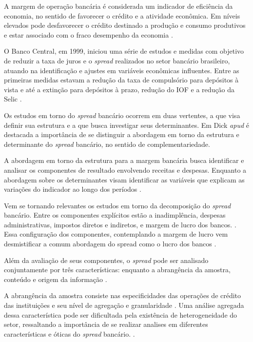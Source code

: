 \documentclass[12pt,openright,oneside,a4paper,chapter=TITLE,section=TITLE,subsection=Title,english,french,spanish,portugues,sumario=tradicional]{04-class-files/abntex2}
\begin{document}
A margem de operação bancária é considerada um indicador de eficiência da economia, no sentido de favorecer o crédito e a atividade econômica. Em níveis elevados pode desfavorecer o crédito destinado a produção e consumo produtivos e estar associado com o fraco desempenho da economia \cite{WB:2005}.

O Banco Central, em 1999, iniciou uma série de estudos e medidas com objetivo de reduzir a taxa de juros e o \emph{spread} realizados no setor bancário brasileiro, atuando na identificação e ajustes em variáveis econômicas influentes. Entre as primeiras medidas estavam a redução da taxa de compulsório para depósitos à vista e até a extinção para depósitos à prazo, redução do IOF e a redução da Selic \cite{BCB:2000}.

Os estudos em torno do \emph{spread} bancário ocorrem em duas vertentes, a que visa definir sua estrutura e a que busca investigar seus determinantes. Em Dick \emph{apud} \cite{leal:2006} é destacada a importância de se distinguir a abordagem em torno da estrutura e determinante do \emph{spread} bancário, no sentido de complementariedade.

A abordagem em torno da estrutura para a margem bancária busca identificar e analisar os componentes de resultado envolvendo receitas e despesas. Enquanto a abordagem sobre os determinantes visam identificar as variáveis que explicam as variações do indicador ao longo dos períodos \cite{leal:2006}.

Vem se tornando relevantes os estudos em torno da decomposição do \emph{spread} bancário. Entre os componentes explícitos estão a inadimplência, despesas administrativas, impostos diretos e indiretos, e margem de lucro dos bancos. \cite{BCB:2000}. Essa configuração dos componentes, contemplando a margem de lucro vem desmistificar a comum abordagem do spread como o lucro dos bancos \cite{costa;nakane:2004}.

Além da avaliação de seus componentes, o \emph{spread} pode ser analisado conjuntamente por três características: enquanto a abrangência da amostra, conteúdo e origem da informação \cite{leal:2006}.

A abrangência da amostra consiste nas especificidades das operações de crédito das instituições e seu nível de agregação e granularidade \cite{costa;nakane:2004}. Uma análise agregada dessa característica pode ser dificultada pela existência de heterogeneidade do setor, ressaltando a importância de se realizar analises em diferentes características e óticas do \emph{spread} bancário. \cite{block:2000}.
\end{document}
